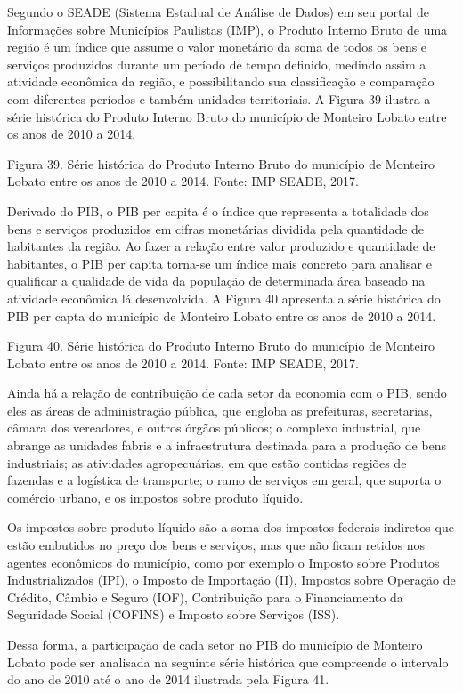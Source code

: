 Segundo o SEADE (Sistema Estadual de Análise de Dados) em seu portal de Informações sobre Municípios Paulistas (IMP), o Produto Interno Bruto de uma região é um índice que assume o valor monetário da soma de todos os bens e serviços produzidos durante um período de tempo definido, medindo assim a atividade econômica da região, e possibilitando sua classificação e comparação com diferentes períodos e também unidades territoriais. A Figura 39 ilustra a série histórica do Produto Interno Bruto do município de Monteiro Lobato entre os anos de 2010 a 2014.
 
Figura 39. Série histórica do Produto Interno Bruto do município de Monteiro Lobato entre os anos de 2010 a 2014.
Fonte: IMP SEADE, 2017.

Derivado do PIB, o PIB per capita é o índice que representa a totalidade dos bens e serviços produzidos em cifras monetárias dividida pela quantidade de habitantes da região. Ao fazer a relação entre valor produzido e quantidade de habitantes, o PIB per capita torna-se um índice mais concreto para analisar e qualificar a qualidade de vida da população de determinada área baseado na atividade econômica lá desenvolvida. A Figura 40 apresenta a série histórica do PIB per capta do município de Monteiro Lobato entre os anos de 2010 a 2014.

Figura 40. Série histórica do Produto Interno Bruto do município de Monteiro Lobato entre os anos de 2010 a 2014.
Fonte: IMP SEADE, 2017.

Ainda há a relação de contribuição de cada setor da economia com o PIB, sendo eles as áreas de administração pública, que engloba as prefeituras, secretarias, câmara dos vereadores, e outros órgãos públicos; o complexo industrial, que abrange as unidades fabris e a infraestrutura destinada para a produção de bens industriais; as atividades agropecuárias, em que estão contidas regiões de fazendas e a logística de transporte; o ramo de serviços em geral, que suporta o comércio urbano, e os impostos sobre produto líquido.

Os impostos sobre produto líquido são a soma dos impostos federais indiretos que estão embutidos no preço dos bens e serviços, mas que não ficam retidos nos agentes econômicos do município, como por exemplo o Imposto sobre Produtos Industrializados (IPI), o Imposto de Importação (II), Impostos sobre Operação de Crédito, Câmbio e Seguro (IOF), Contribuição para o Financiamento da Seguridade Social (COFINS) e Imposto sobre Serviços (ISS).

Dessa forma, a participação de cada setor no PIB do município de Monteiro Lobato pode ser analisada na seguinte série histórica que compreende o intervalo do ano de 2010 até o ano de 2014 ilustrada pela Figura 41.
 
